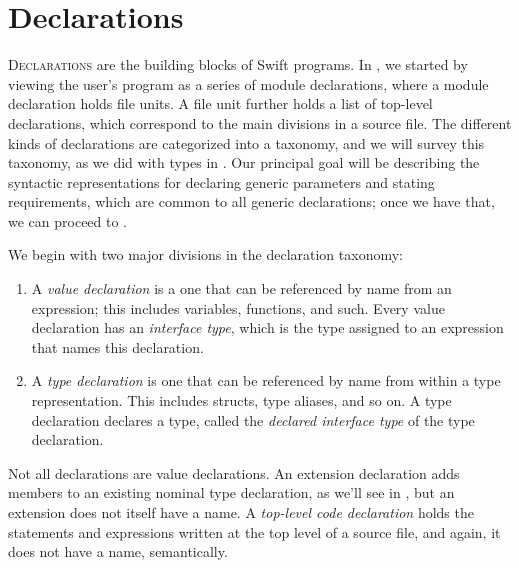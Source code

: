 \documentclass[../generics]{subfiles}
\begin{document}
\chapter{Declarations}\label{decls}

\lettrine{D}{eclarations} are the building blocks of Swift programs. In , we started by viewing the user's program as a series of module declarations, where a module declaration holds file units. A file unit further holds a list of top-level declarations, which correspond to the main divisions in a source file. The different kinds of declarations are categorized into a taxonomy, and we will survey this taxonomy, as we did with types in . Our principal goal will be describing the syntactic representations for declaring generic parameters and stating requirements, which are common to all generic declarations; once we have that, we can proceed to .

We begin with two major divisions in the declaration taxonomy:
\begin{enumerate}
\item A \emph{value declaration} is a one that can be referenced by name from an expression; this includes variables, functions, and such. Every value declaration has an \emph{interface type}, which is the type assigned to an expression that names this declaration.
\item A \emph{type declaration} is one that can be referenced by name from within a type representation. This includes structs, type aliases, and so on. A type declaration declares a type, called the \emph{declared interface type} of the type declaration.
\end{enumerate}
Not all declarations are value declarations. An extension declaration adds members to an existing nominal type declaration, as we'll see in , but an extension does not itself have a name. A \emph{top-level code declaration} holds the statements and expressions written at the top level of a source file, and again, it does not have a name, semantically.
\end{document}
